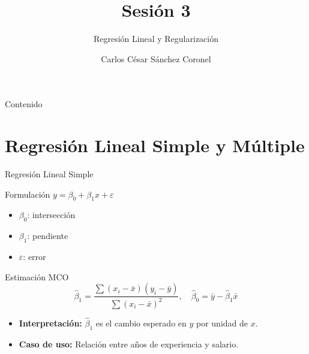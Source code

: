 \documentclass[aspectratio=169, 10pt, xcolor=table]{beamer}
\title[SESIÓN 3]{\textbf{Sesión 3}}
\subtitle{Regresión Lineal y Regularización}
\author[Prof. C. Sánchez]{Carlos César Sánchez Coronel}
\institute{\textbf{MACHINE LEARNING}}
\date{}
\begin{document}
\begin{frame}
    \titlepage
\end{frame}

\begin{frame}{Contenido}
    \tableofcontents
\end{frame}

\section{Regresión Lineal Simple y Múltiple}

\begin{frame}{Regresión Lineal Simple}
    \begin{block}{Formulación}
        $y = \beta_0 + \beta_1 x + \varepsilon$
        \begin{itemize}
            \item $\beta_0$: intersección
            \item $\beta_1$: pendiente
            \item $\varepsilon$: error
        \end{itemize}
    \end{block}
    \begin{exampleblock}{Estimación MCO}
        \[
        \hat{\beta}_1 = \frac{\sum (x_i - \bar{x})(y_i - \bar{y})}{\sum (x_i - \bar{x})^2}, \quad
        \hat{\beta}_0 = \bar{y} - \hat{\beta}_1\bar{x}
        \]
    \end{exampleblock}
    \begin{itemize}
        \item \textbf{Interpretación:} $\hat{\beta}_1$ es el cambio esperado en $y$ por unidad de $x$.
        \item \textbf{Caso de uso:} Relación entre años de experiencia y salario.
    \end{itemize}
\end{frame}
\end{document}
